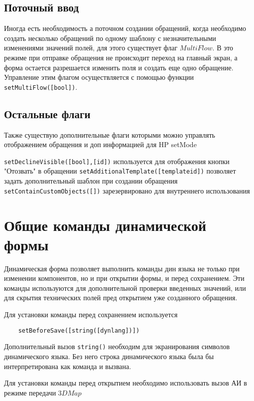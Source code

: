 \documentclass[../index.tex]{subfiles}
\begin{document}
\subsection{Поточный ввод}
Иногда есть необходимость а поточном создании обращений, когда необходимо создать несколько обращений по одному 
шаблону с незначительными изменениями значений полей, для этого существует флаг $MultiFlow$. В это режиме
при отправке обращения не происходит переход на главный экран, а форма остается разрешается изменить поля и 
создать еще одно обращение. Управление этим флагом осуществляется с помощью функции \verb|setMultiFlow([bool])|.

\subsection{Остальные флаги}
Также существую дополнительные флаги которыми можно управлять отображением обращения и доп информацией для HP setMode

\verb|setDeclineVisible([bool],[id])| используется для отображения кнопки "Отозвать" в обращении
\verb|setAdditionalTemplate([templateid])| позволяет задать дополнительный шаблон при создании обращения
\verb|setContainCustomObjects([])| зарезервировано для внутреннего использования

\section{Общие команды динамической формы}
Динамическая форма позволяет выполнить команды дин языка не только при изменении компонентов, но и при открытии формы,
и перед сохранением. Эти команды используются для дополнительной проверки введенных значений, или для скрытия 
технических полей пред открытием уже созданного обращения.

Для установки команды перед сохранением используется
\begin{verbatim}
	setBeforeSave([string([dynlang])])
\end{verbatim}
Дополнительный вызов \verb|string()| необходим для экранирования символов динамического языка. Без него строка динамического языка
была бы интерпретирована как команда и вызвана.

Для установки команды перед открытием необходимо использовать вызов АИ в режиме передачи $3DMap$
\end{document}
